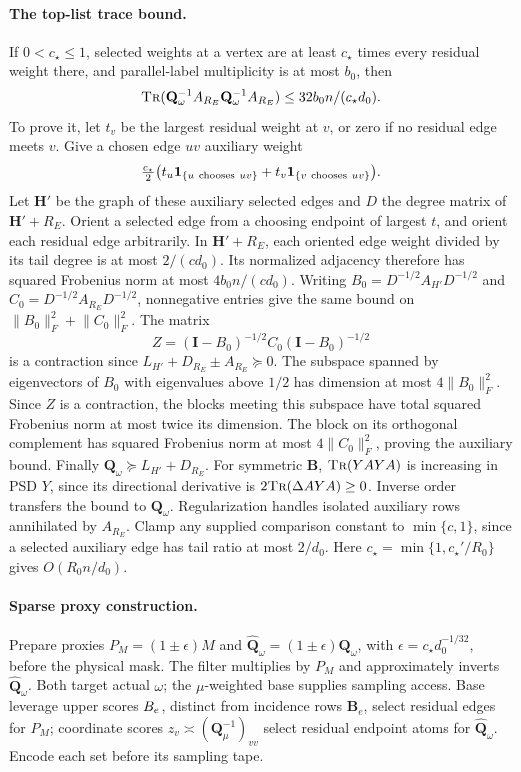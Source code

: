 \documentclass[11pt]{article}
\theoremstyle{remark}
\newcommand{\BB}{\mathbf B}
\newcommand{\II}{\mathbf I}
\newcommand{\HH}{\mathbf H}
\newcommand{\QQ}{\mathbf Q}
\newcommand{\norm}[1]{\lVert#1\rVert}
\newcommand{\tr}{\textsc{Tr}}
\begin{document}
\paragraph{The top-list trace bound.}
If $0<c_\star\le1$, selected weights at a vertex are at least $c_\star$ times every residual
weight there, and parallel-label multiplicity is at most $b_0$, then
\begin{equation}\label{eq:ram27-top}
 \tr(\QQ_\omega^{-1}A_{R_E}\QQ_\omega^{-1}A_{R_E})
                       \le 32b_0 n/(c_\star d_0).
\end{equation}
To prove it, let $t_v$ be the largest residual weight at $v$, or zero if no
residual edge meets $v$.
Give a chosen edge $uv$ auxiliary weight
\[
 \tfrac{c_\star}{2}\bigl(t_u\mathbf1_{\{u\ {\rm chooses}\ uv\}}
                  +t_v\mathbf1_{\{v\ {\rm chooses}\ uv\}}\bigr).
\]
Let $\HH'$ be the graph of these auxiliary selected edges and $D$ the degree
matrix of $\HH'+R_E$.
Orient a selected edge from a choosing endpoint of largest $t$, and orient each
residual edge arbitrarily.
In $\HH'+R_E$, each oriented edge weight divided by its tail degree is at most
$2/(cd_0)$.
Its normalized adjacency therefore has squared Frobenius norm at most
$4b_0n/(cd_0)$.
Writing $B_0=D^{-1/2}A_{H'}D^{-1/2}$ and $C_0=D^{-1/2}A_{R_E}D^{-1/2}$,
nonnegative entries give the same bound on $\norm{B_0}_F^2+\norm{C_0}_F^2$.
The matrix
\[
 Z=(\II-B_0)^{-1/2}C_0(\II-B_0)^{-1/2}
\]
is a contraction since $L_{H'}+D_{R_E}\pm A_{R_E}\succeq0$.
The subspace spanned by eigenvectors of $B_0$ with eigenvalues above $1/2$ has
dimension at most $4\norm{B_0}_F^2$.
Since $Z$ is a contraction, the blocks meeting this subspace have total squared
Frobenius norm at most twice its dimension.
The block on its orthogonal complement has squared Frobenius norm at most
$4\norm{C_0}_F^2$, proving the auxiliary bound.
Finally $\QQ_\omega\succeq L_{H'}+D_{R_E}$.
For symmetric $\BB$, $\tr(YAYA)$ is increasing in PSD $Y$, since its directional
derivative is $2\tr(\Delta AYA)\ge0$.
Inverse order transfers the bound to $\QQ_\omega$.
Regularization handles isolated auxiliary rows annihilated by $A_{R_E}$.
Clamp any supplied comparison constant to $\min\{c,1\}$, since a selected
auxiliary edge has tail ratio at most $2/d_0$.
Here $c_\star=\min\{1,c_\star'/R_0\}$ gives $O(R_0n/d_0)$.

\paragraph{Sparse proxy construction.}
Prepare proxies $P_M=(1\pm\epsilon)M$ and $\widehat{\QQ}_\omega=(1\pm\epsilon)\QQ_\omega$, with
$\epsilon=c_\star d_0^{-1/32}$, before the physical mask.
The filter multiplies by $P_M$ and approximately inverts $\widehat{\QQ}_\omega$.
Both target actual $\omega$; the $\mu$-weighted base supplies sampling access.
Base leverage upper scores $\mathcal \BB_e$, distinct from incidence rows $\BB_e$,
select residual edges for $P_M$; coordinate scores $z_v\asymp(\QQ_\mu^{-1})_{vv}$
select residual endpoint atoms for $\widehat{\QQ}_\omega$.
Encode each set before its sampling tape.
\end{document}
